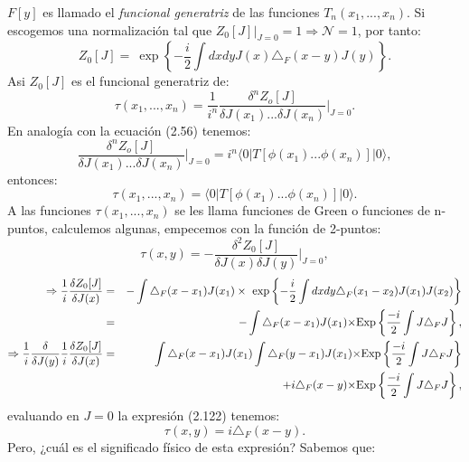 $F[y]$ es llamado el \textit{funcional generatriz} de las funciones  $T_{n}(x_{1},...,x_{n})$. Si escogemos una normalización tal que $Z_0[J]\bigg|_{J=0}=1 \Rightarrow \mathcal{N}=1$, por tanto:
\begin{equation}
Z_{0}[J]=\ \exp\left\{ -\frac{i}{2}\int dxdyJ(x)\triangle_{F}(x-y)J(y)\right\} .
\end{equation}
Asi $Z_0[J]$ es el funcional generatriz de:
\begin{equation}
\tau(x_{1},...,x_{n})=\frac{1}{i^{n}}\frac{\delta^{n}Z_{o}[J]}{\delta J(x_{1})...\delta J(x_{n})}\bigg|_{J=0}.
\end{equation}
En analogía con la ecuación (2.56) tenemos:
\begin{equation}
\frac{\delta^{n}Z_{o}[J]}{\delta J(x_{1})...\delta J(x_{n})}\bigg|_{J=0}=i^{n}\langle0|T[\phi(x_{1})...\phi(x_{n})]|0\rangle ,
\end{equation}
entonces:
\begin{equation}
\tau(x_1,...,x_n)=\langle0|T[\phi(x_{1})...\phi(x_{n})]|0\rangle .
\end{equation}
A las funciones $\tau(x_1,...,x_n)$ se les llama funciones de Green o funciones de n-puntos, calculemos algunas, empecemos con la función de 2-puntos:
\begin{equation}
\tau(x,y)=-\frac{\delta^2Z_0[J]}{\delta J(x)\delta J(y)}\bigg|_{J=0} ,
\end{equation}
\begin{eqnarray}
\nonumber \Rightarrow \frac{1}{i}\frac{\delta Z_{0}[J]}{\delta J(x)}&=&-\int\triangle_{F}(x-x_{1})J(x_{1})\times\ \exp\left\{ -\frac{i}{2}\int dxdy\text{\ensuremath{\triangle}}_{F}(x_{1}-x_{2})J(x_{1})J(x_{2})\right\}\\
\nonumber &=& -\int\triangle_{F}(x-x_{1})J(x_{1})\text{\ensuremath{\times}Exp}\left\{ \frac{-i}{2}\int J\triangle_{F}J\right\} ,\\ 
\nonumber \Rightarrow \frac{1}{i}\frac{\delta}{\delta J(y)}\frac{1}{i}\frac{\delta Z_{0}[J]}{\delta J(x)}&=&\int\triangle_{F}(x-x_{1})J(x_{1})\int\triangle_{F}(y-x_{1})J(x_{1})\text{\ensuremath{\times}Exp}\left\{ \frac{-i}{2}\int J\triangle_{F}J\right\}\\
&&+ i\triangle_{F}(x-y)\text{\ensuremath{\times}Exp}\left\{ \frac{-i}{2}\int J\triangle_{F}J\right\} ,
\end{eqnarray}
evaluando en $J=0$ la expresión (2.122) tenemos:
\begin{equation}
\tau(x,y)=i\triangle_F(x-y) .
\end{equation}
Pero, ¿cuál es el significado físico de esta expresión? Sabemos que:
